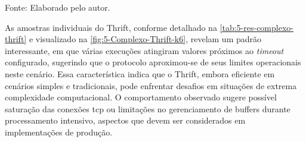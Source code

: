 \begin{table}[H]
\centering
\caption{Thrift comparado com os demais protocolos — Cenário Complexo (\acrshort{grpc}/\gls{rest} em $\Delta$\% vs Thrift)}
\label{tab:5-res-complexo-thrift}
{\par \raggedright \footnotesize Fonte: Elaborado pelo autor.\par}
\end{table}

As amostras individuais do Thrift, conforme detalhado na \autoref{tab:5-res-complexo-thrift} e visualizado na \autoref{fig:5-Complexo-Thrift-k6}, revelam um padrão interessante, em que várias execuções atingiram valores próximos ao \textit{timeout} configurado, sugerindo que o protocolo aproximou-se de seus limites operacionais neste cenário. Essa característica indica que o Thrift, embora eficiente em cenários simples e tradicionais, pode enfrentar desafios em situações de extrema complexidade computacional. O comportamento observado sugere possível saturação das conexões \acrshort{tcp} ou limitações no gerenciamento de buffers durante processamento intensivo, aspectos que devem ser considerados em implementações de produção.

